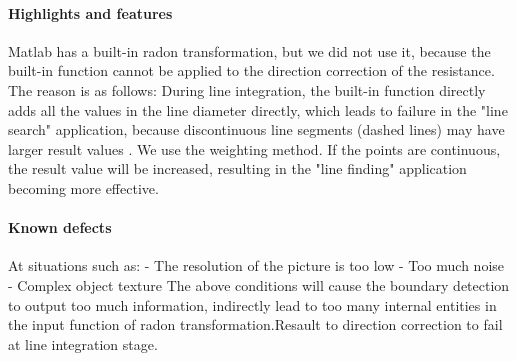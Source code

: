 \documentclass{article}
\begin{document}
\paragraph{Highlights and features}

Matlab has a built-in radon transformation, but we did not use it, because the built-in function cannot be applied to the direction correction of the resistance. The reason is as follows: During line integration, the built-in function directly adds all the values in the line diameter directly, which leads to failure in the "line search" application, because discontinuous line segments (dashed lines) may have larger result values .
We use the weighting method. If the points are continuous, the result value will be increased, resulting in the "line finding" application becoming more effective.

\paragraph{Known defects}

At situations such as:
- The resolution of the picture is too low
- Too much noise
- Complex object texture
The above conditions will cause the boundary detection to output too much information, indirectly lead to too many internal entities in the input function of radon transformation.Resault to direction correction to fail at line integration stage.

\end{document}
